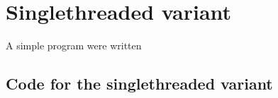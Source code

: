 \section{Singlethreaded variant}
A simple program were written
\subsection{Code for the singlethreaded variant}
\inputminted[tabsize=4]{c}{../SingleThread.c}